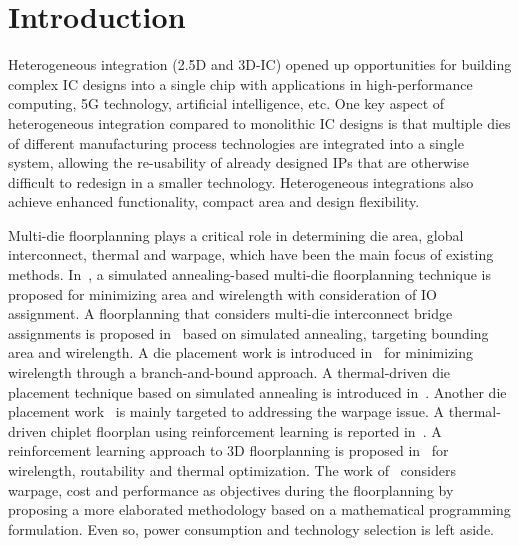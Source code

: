 \section{Introduction}
\label{sec:introduction}


Heterogeneous integration (2.5D and 3D-IC) opened up opportunities for building complex IC designs into a single chip with applications in high-performance computing, 5G technology, artificial intelligence, etc. One key aspect of heterogeneous integration compared to monolithic IC designs is that multiple dies of different manufacturing process technologies are integrated into a single system, allowing the re-usability of already designed IPs that are otherwise difficult to redesign in a smaller technology. Heterogeneous integrations also achieve enhanced functionality, compact area and design flexibility. 

Multi-die floorplanning plays a critical role in determining die area, global interconnect, thermal and warpage, which have been the main focus of existing methods. %
In~\cite{ho2013btreeSA}, a simulated annealing-based multi-die floorplanning technique is proposed for minimizing area and wirelength with consideration of IO assignment. A floorplanning that considers multi-die interconnect bridge assignments is proposed in~\cite{lee2023multiDieFloorplan} based on simulated annealing, targeting bounding area and wirelength. A die placement work is introduced in~\cite{osmolovskyi2018diePlacement} for minimizing wirelength through a branch-and-bound approach. A thermal-driven die placement technique based on simulated annealing is introduced in~\cite{ma2021thermalFloorplan}.
Another die placement work~\cite{hsu2022warpageFloorplan} is mainly targeted to addressing the warpage issue. A thermal-driven chiplet floorplan using reinforcement learning is reported in~\cite{duan2024RLPlanner}.
A reinforcement learning approach to 3D floorplanning
is proposed in~\cite{amin2024RLFloorplan3D} for wirelength, routability and thermal optimization. The work of~\cite{chen2024floorplet} considers warpage, cost and performance as objectives during the floorplanning by proposing a more elaborated methodology based on a mathematical programming formulation. Even so, power consumption and technology selection is left aside. 


